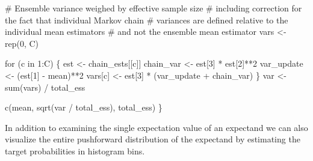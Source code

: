 \documentclass[
  letterpaper,
  DIV=11,
  numbers=noendperiod]{scrartcl}
\newenvironment{Shaded}{\begin{snugshade}}{\end{snugshade}}
\newcommand{\CommentTok}[1]{\textcolor[rgb]{0.37,0.37,0.37}{#1}}
\newcommand{\ControlFlowTok}[1]{\textcolor[rgb]{0.00,0.23,0.31}{#1}}
\newcommand{\DecValTok}[1]{\textcolor[rgb]{0.68,0.00,0.00}{#1}}
\newcommand{\FunctionTok}[1]{\textcolor[rgb]{0.28,0.35,0.67}{#1}}
\newcommand{\NormalTok}[1]{\textcolor[rgb]{0.00,0.23,0.31}{#1}}
\newcommand{\OtherTok}[1]{\textcolor[rgb]{0.00,0.23,0.31}{#1}}
\newcommand{\SpecialCharTok}[1]{\textcolor[rgb]{0.37,0.37,0.37}{#1}}
\begin{document}
\begin{Shaded}
\begin{Highlighting}[]
  \CommentTok{\# Ensemble variance weighed by effective sample size}
  \CommentTok{\# including correction for the fact that individual Markov chain}
  \CommentTok{\# variances are defined relative to the individual mean estimators}
  \CommentTok{\# and not the ensemble mean estimator}
\NormalTok{  vars }\OtherTok{\textless{}{-}} \FunctionTok{rep}\NormalTok{(}\DecValTok{0}\NormalTok{, C)}
  
  \ControlFlowTok{for}\NormalTok{ (c }\ControlFlowTok{in} \DecValTok{1}\SpecialCharTok{:}\NormalTok{C) \{}
\NormalTok{    est }\OtherTok{\textless{}{-}}\NormalTok{ chain\_ests[[c]]}
\NormalTok{    chain\_var }\OtherTok{\textless{}{-}}\NormalTok{ est[}\DecValTok{3}\NormalTok{] }\SpecialCharTok{*}\NormalTok{ est[}\DecValTok{2}\NormalTok{]}\SpecialCharTok{**}\DecValTok{2}
\NormalTok{    var\_update }\OtherTok{\textless{}{-}}\NormalTok{ (est[}\DecValTok{1}\NormalTok{] }\SpecialCharTok{{-}}\NormalTok{ mean)}\SpecialCharTok{**}\DecValTok{2}
\NormalTok{    vars[c] }\OtherTok{\textless{}{-}}\NormalTok{ est[}\DecValTok{3}\NormalTok{] }\SpecialCharTok{*}\NormalTok{ (var\_update }\SpecialCharTok{+}\NormalTok{ chain\_var)}
\NormalTok{  \}}
\NormalTok{  var }\OtherTok{\textless{}{-}} \FunctionTok{sum}\NormalTok{(vars) }\SpecialCharTok{/}\NormalTok{ total\_ess}
  
  \FunctionTok{c}\NormalTok{(mean, }\FunctionTok{sqrt}\NormalTok{(var }\SpecialCharTok{/}\NormalTok{ total\_ess), total\_ess)}
\NormalTok{\}}
\end{Highlighting}
\end{Shaded}

In addition to examining the single expectation value of an expectand we
can also visualize the entire pushforward distribution of the expectand
by estimating the target probabilities in histogram bins.
\end{document}
